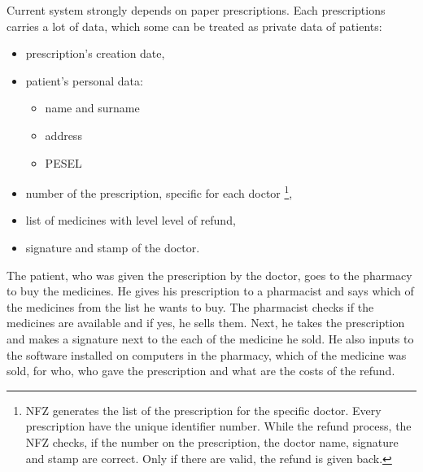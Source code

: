 Current system strongly depends on paper prescriptions. Each prescriptions carries a lot of data, which some can be treated as private data of patients:
\\
\begin{itemize}
	\item prescription's creation date,\\
	\item patient's personal data:\\
	\begin{itemize}
		\item name and surname
		\item address
		\item PESEL\\
	\end{itemize}
	\item number of the prescription, specific for each doctor \footnote{NFZ generates the list of the prescription for the specific doctor. Every prescription have the unique
	identifier number. While the refund process, the NFZ checks, if the number on the prescription, the
	doctor name, signature and stamp are correct. Only if there are valid, the refund is given back.},\\
	\item list of medicines with level level of refund,\\
	\item signature and stamp of the doctor.\\
\end{itemize}

The patient, who was given the prescription by the doctor, goes to the pharmacy to buy the medicines. He gives his prescription to a pharmacist and says which of the medicines from the list he wants to buy. The pharmacist checks if the medicines are available and if yes, he sells them. Next, he takes the prescription and makes a signature next to the each of the medicine he sold. He also inputs to the software installed on
computers in the pharmacy, which of the medicine was sold, for who, who gave the prescription and what are the costs of the refund.\\


